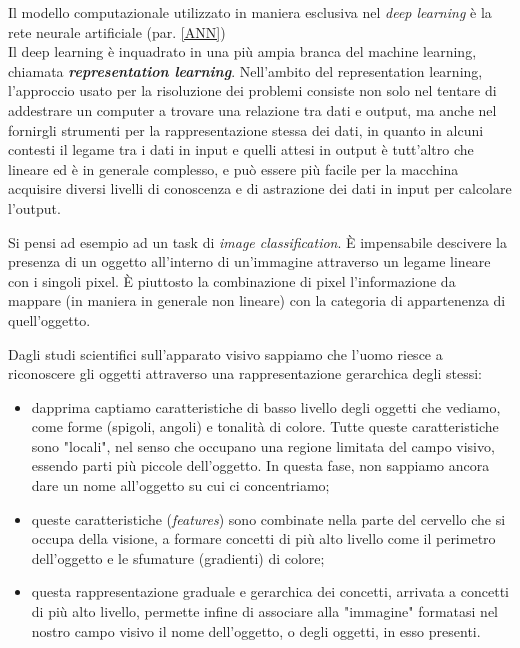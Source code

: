 Il modello computazionale utilizzato in maniera esclusiva nel \textit{deep learning} è la rete neurale artificiale (par. \ref{ANN})\\

Il deep learning è inquadrato in una più ampia branca del machine learning, chiamata \textbf{\textit{representation learning}}. Nell'ambito del representation learning, l'approccio usato per la risoluzione dei problemi consiste non solo nel tentare di addestrare un computer a trovare una relazione tra dati e output, ma anche nel fornirgli strumenti per la rappresentazione stessa dei dati, in quanto in alcuni contesti il legame tra i dati in input e quelli attesi in output è tutt'altro che lineare ed è in generale complesso, e può essere più facile per la macchina acquisire diversi livelli di conoscenza e di astrazione dei dati in input per calcolare l'output.

Si pensi ad esempio ad un task di \textit{image classification}. È impensabile descivere la presenza di un oggetto all’interno di un'immagine attraverso un legame lineare con i singoli pixel. È piuttosto la combinazione di pixel l'informazione da mappare (in maniera in generale non lineare) con la categoria di appartenenza di quell'oggetto.

Dagli studi scientifici sull'apparato visivo sappiamo che l'uomo riesce a riconoscere gli oggetti attraverso una rappresentazione gerarchica degli stessi:

\begin{itemize}
\item dapprima captiamo caratteristiche di basso livello degli oggetti che vediamo, come forme (spigoli, angoli) e tonalità di colore. Tutte queste caratteristiche sono "locali", nel senso che occupano una regione limitata del campo visivo, essendo parti più piccole dell'oggetto. In questa fase, non sappiamo ancora dare un nome all'oggetto su cui ci concentriamo;
\item queste caratteristiche (\textit{features}) sono combinate nella parte del cervello che si occupa della visione, a formare concetti di più alto livello come il perimetro dell'oggetto e le sfumature (gradienti) di colore;
\item questa rappresentazione graduale e gerarchica dei concetti, arrivata a concetti di più alto livello, permette infine di associare alla "immagine" formatasi nel nostro campo visivo il nome dell'oggetto, o degli oggetti, in esso presenti.
\end{itemize}

